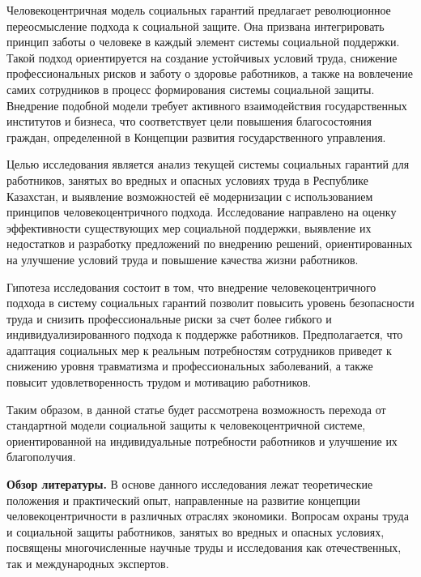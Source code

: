 Человекоцентричная модель социальных гарантий предлагает революционное
переосмысление подхода к социальной защите. Она призвана интегрировать
принцип заботы о человеке в каждый элемент системы социальной поддержки.
Такой подход ориентируется на создание устойчивых условий труда,
снижение профессиональных рисков и заботу о здоровье работников, а также
на вовлечение самих сотрудников в процесс формирования системы
социальной защиты. Внедрение подобной модели требует активного
взаимодействия государственных институтов и бизнеса, что соответствует
цели повышения благосостояния граждан, определенной в Концепции развития
государственного управления.

Целью исследования является анализ текущей системы социальных гарантий
для работников, занятых во вредных и опасных условиях труда в Республике
Казахстан, и выявление возможностей её модернизации с использованием
принципов человекоцентричного подхода. Исследование направлено на оценку
эффективности существующих мер социальной поддержки, выявление их
недостатков и разработку предложений по внедрению решений,
ориентированных на улучшение условий труда и повышение качества жизни
работников.

Гипотеза исследования состоит в том, что внедрение человекоцентричного
подхода в систему социальных гарантий позволит повысить уровень
безопасности труда и снизить профессиональные риски за счет более
гибкого и индивидуализированного подхода к поддержке работников.
Предполагается, что адаптация социальных мер к реальным потребностям
сотрудников приведет к снижению уровня травматизма и профессиональных
заболеваний, а также повысит удовлетворенность трудом и мотивацию
работников.

Таким образом, в данной статье будет рассмотрена возможность перехода от
стандартной модели социальной защиты к человекоцентричной системе,
ориентированной на индивидуальные потребности работников и улучшение их
благополучия.

{\bfseries Обзор литературы.} В основе данного исследования лежат
теоретические положения и практический опыт, направленные на развитие
концепции человекоцентричности в различных отраслях экономики. Вопросам
охраны труда и социальной защиты работников, занятых во вредных и
опасных условиях, посвящены многочисленные научные труды и исследования
как отечественных, так и международных экспертов.

